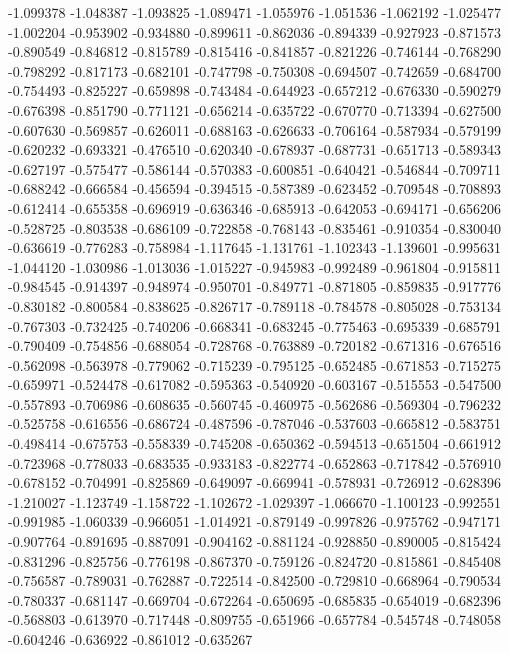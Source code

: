 -1.099378
-1.048387
-1.093825
-1.089471
-1.055976
-1.051536
-1.062192
-1.025477
-1.002204
-0.953902
-0.934880
-0.899611
-0.862036
-0.894339
-0.927923
-0.871573
-0.890549
-0.846812
-0.815789
-0.815416
-0.841857
-0.821226
-0.746144
-0.768290
-0.798292
-0.817173
-0.682101
-0.747798
-0.750308
-0.694507
-0.742659
-0.684700
-0.754493
-0.825227
-0.659898
-0.743484
-0.644923
-0.657212
-0.676330
-0.590279
-0.676398
-0.851790
-0.771121
-0.656214
-0.635722
-0.670770
-0.713394
-0.627500
-0.607630
-0.569857
-0.626011
-0.688163
-0.626633
-0.706164
-0.587934
-0.579199
-0.620232
-0.693321
-0.476510
-0.620340
-0.678937
-0.687731
-0.651713
-0.589343
-0.627197
-0.575477
-0.586144
-0.570383
-0.600851
-0.640421
-0.546844
-0.709711
-0.688242
-0.666584
-0.456594
-0.394515
-0.587389
-0.623452
-0.709548
-0.708893
-0.612414
-0.655358
-0.696919
-0.636346
-0.685913
-0.642053
-0.694171
-0.656206
-0.528725
-0.803538
-0.686109
-0.722858
-0.768143
-0.835461
-0.910354
-0.830040
-0.636619
-0.776283
-0.758984
-1.117645
-1.131761
-1.102343
-1.139601
-0.995631
-1.044120
-1.030986
-1.013036
-1.015227
-0.945983
-0.992489
-0.961804
-0.915811
-0.984545
-0.914397
-0.948974
-0.950701
-0.849771
-0.871805
-0.859835
-0.917776
-0.830182
-0.800584
-0.838625
-0.826717
-0.789118
-0.784578
-0.805028
-0.753134
-0.767303
-0.732425
-0.740206
-0.668341
-0.683245
-0.775463
-0.695339
-0.685791
-0.790409
-0.754856
-0.688054
-0.728768
-0.763889
-0.720182
-0.671316
-0.676516
-0.562098
-0.563978
-0.779062
-0.715239
-0.795125
-0.652485
-0.671853
-0.715275
-0.659971
-0.524478
-0.617082
-0.595363
-0.540920
-0.603167
-0.515553
-0.547500
-0.557893
-0.706986
-0.608635
-0.560745
-0.460975
-0.562686
-0.569304
-0.796232
-0.525758
-0.616556
-0.686724
-0.487596
-0.787046
-0.537603
-0.665812
-0.583751
-0.498414
-0.675753
-0.558339
-0.745208
-0.650362
-0.594513
-0.651504
-0.661912
-0.723968
-0.778033
-0.683535
-0.933183
-0.822774
-0.652863
-0.717842
-0.576910
-0.678152
-0.704991
-0.825869
-0.649097
-0.669941
-0.578931
-0.726912
-0.628396
-1.210027
-1.123749
-1.158722
-1.102672
-1.029397
-1.066670
-1.100123
-0.992551
-0.991985
-1.060339
-0.966051
-1.014921
-0.879149
-0.997826
-0.975762
-0.947171
-0.907764
-0.891695
-0.887091
-0.904162
-0.881124
-0.928850
-0.890005
-0.815424
-0.831296
-0.825756
-0.776198
-0.867370
-0.759126
-0.824720
-0.815861
-0.845408
-0.756587
-0.789031
-0.762887
-0.722514
-0.842500
-0.729810
-0.668964
-0.790534
-0.780337
-0.681147
-0.669704
-0.672264
-0.650695
-0.685835
-0.654019
-0.682396
-0.568803
-0.613970
-0.717448
-0.809755
-0.651966
-0.657784
-0.545748
-0.748058
-0.604246
-0.636922
-0.861012
-0.635267
